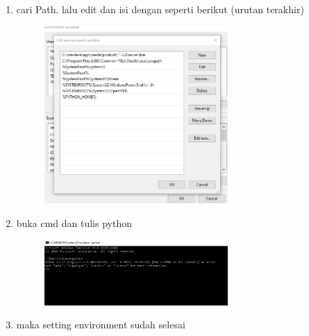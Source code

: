 \begin{enumerate}
	\item cari Path. lalu edit dan isi dengan seperti berikut (urutan terakhir)
	\begin{figure} [h]
	\includegraphics[width=7cm]{section/picpyt/env/env7.png}
	\centering
	\end{figure}
	
	\item buka cmd dan tulis python
	\begin{figure} [h]
	\includegraphics[width=7cm]{section/picpyt/env/env5.png}
	\centering
	\end{figure}
	
	\item maka setting environment sudah selesai
	
	
	
	
    \end{enumerate}



